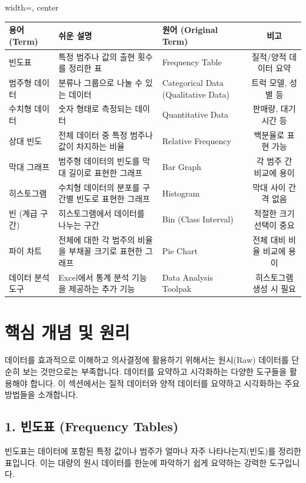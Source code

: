 \documentclass[11pt,a4paper]{book}
\theoremstyle{definition}
\begin{document}
\begin{adjustbox}{width=\textwidth, center}
\begin{tabular}{lllc}
\toprule
\textbf{용어 (Term)} & \textbf{쉬운 설명} & \textbf{원어 (Original Term)} & \textbf{비고} \\
\midrule
빈도표 & 특정 범주나 값의 출현 횟수를 정리한 표 & Frequency Table & 질적/양적 데이터 요약 \\
범주형 데이터 & 분류나 그룹으로 나눌 수 있는 데이터 & Categorical Data (Qualitative Data) & 트럭 모델, 성별 등 \\
수치형 데이터 & 숫자 형태로 측정되는 데이터 & Quantitative Data & 판매량, 대기 시간 등 \\
상대 빈도 & 전체 데이터 중 특정 범주나 값이 차지하는 비율 & Relative Frequency & 백분율로 표현 가능 \\
막대 그래프 & 범주형 데이터의 빈도를 막대 길이로 표현한 그래프 & Bar Graph & 각 범주 간 비교에 용이 \\
히스토그램 & 수치형 데이터의 분포를 구간별 빈도로 표현한 그래프 & Histogram & 막대 사이 간격 없음 \\
빈 (계급 구간) & 히스토그램에서 데이터를 나누는 구간 & Bin (Class Interval) & 적절한 크기 선택이 중요 \\
파이 차트 & 전체에 대한 각 범주의 비율을 부채꼴 크기로 표현한 그래프 & Pie Chart & 전체 대비 비율 비교에 용이 \\
데이터 분석 도구 & Excel에서 통계 분석 기능을 제공하는 추가 기능 & Data Analysis Toolpak & 히스토그램 생성 시 필요 \\
\bottomrule
\end{tabular}
\end{adjustbox}


\section{핵심 개념 및 원리}

데이터를 효과적으로 이해하고 의사결정에 활용하기 위해서는 원시(Raw) 데이터를 단순히 보는 것만으로는 부족합니다. 데이터를 요약하고 시각화하는 다양한 도구들을 활용해야 합니다. 이 섹션에서는 질적 데이터와 양적 데이터를 요약하고 시각화하는 주요 방법들을 소개합니다.

\subsection{1. 빈도표 (Frequency Tables)}
빈도표는 데이터에 포함된 특정 값이나 범주가 얼마나 자주 나타나는지(빈도)를 정리한 표입니다. 이는 대량의 원시 데이터를 한눈에 파악하기 쉽게 요약하는 강력한 도구입니다.
\end{document}

